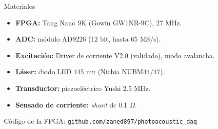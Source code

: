 \documentclass[aspectratio=169,12pt]{beamer}
\begin{document}
\begin{frame}{Materiales}
  \begin{itemize}
    \item \textbf{FPGA:} Tang Nano 9K (Gowin GW1NR-9C), 27 MHz.
    \item \textbf{ADC:} módulo AD9226 (12 bit, hasta 65 MS/s).
    \item \textbf{Excitación:} Driver de corriente V2.0 (validado), modo avalancha.
    \item \textbf{Láser:} diodo LED 445 nm (Nichia NUBM44/47).
    \item \textbf{Transductor:} piezoeléctrico Yushi 2.5 MHz.
    \item \textbf{Sensado de corriente:} \textit{shunt} de 0.1 $\Omega$.
  \end{itemize}
  \vfill
  {\footnotesize Código de la FPGA: \texttt{github.com/zaned897/photoacoustic\_daq}}
\end{frame}
\end{document}
